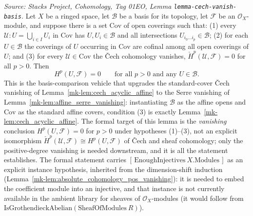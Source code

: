 \begin{lemma}\label{mk-lem:cech_to_cohomology_on_basis}
  \leanok

  \textit{Source: Stacks Project, Cohomology, Tag 01EO, Lemma
  \texttt{lemma-cech-vanish-basis}.}
  Let \(X\) be a ringed space, let \(\mathcal{B}\) be a basis for its topology, let
  \(\mathcal{F}\) be an \(\mathcal{O}_X\)-module, and suppose there is a set
  \(\mathrm{Cov}\) of open coverings such that: (1) every \(\mathcal{U} :
  U = \bigcup_{i \in I} U_i\) in \(\mathrm{Cov}\) has \(U, U_i \in \mathcal{B}\) and
  all intersections \(U_{i_0 \ldots i_p} \in \mathcal{B}\); (2) for each
  \(U \in \mathcal{B}\) the coverings of \(U\) occurring in \(\mathrm{Cov}\) are
  cofinal among all open coverings of \(U\); and (3) for every \(\mathcal{U} \in
  \mathrm{Cov}\) the {\v C}ech cohomology vanishes,
  \(\check{H}^p(\mathcal{U}, \mathcal{F}) = 0\) for all \(p > 0\). Then
  \[
    H^p(U, \mathcal{F}) = 0 \qquad \text{for all } p > 0 \text{ and any }
      U \in \mathcal{B}.
  \]
  This is the basis-comparison vehicle that upgrades the standard-cover {\v C}ech
  vanishing of Lemma~\ref{mk-lem:cech_acyclic_affine} to the Serre vanishing of
  Lemma~\ref{mk-lem:affine_serre_vanishing}: instantiating \(\mathcal{B}\) as the affine
  opens and \(\mathrm{Cov}\) as the standard affine covers, condition (3) is exactly
  Lemma~\ref{mk-lem:cech_acyclic_affine}. The formal target of this lemma is the
  \emph{vanishing} conclusion \(H^p(U, \mathcal{F}) = 0\) for \(p > 0\) under
  hypotheses (1)--(3), not an explicit isomorphism \(\check{H}^p(\mathcal{U},
  \mathcal{F}) \cong H^p(U, \mathcal{F})\) of {\v C}ech and sheaf cohomology; only
  the positive-degree vanishing is needed downstream, and it is all the statement
  establishes. The formal statement carries
  \([\,\mathrm{EnoughInjectives}\ X.\mathrm{Modules}\,]\) as an explicit instance hypothesis,
  inherited from the dimension-shift induction (Lemma~\ref{mk-lem:absolute_cohomology_pos_vanishing}):
  it is needed to embed the coefficient module into an injective, and that instance is not currently
  available in the ambient library for sheaves of \(\mathcal{O}_X\)-modules (it would follow from
  \(\mathrm{IsGrothendieckAbelian}(\mathrm{SheafOfModules}\ R)\)).
\end{lemma}
